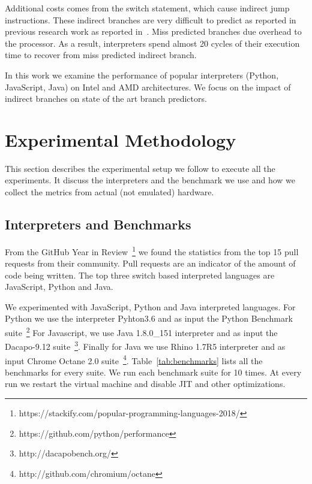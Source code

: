 \documentclass[parskip=full, paper=a4, fontsize=12pt]{scrartcl}
\numberwithin{equation}{section}
\numberwithin{figure}{section}
\numberwithin{table}{section}
\begin{document}
Additional costs comes from the switch statement, which cause indirect
jump instructions. These indirect branches are very difficult to
predict as reported in previous research work as reported
in~\cite{performance_of_interpreters}. Miss predicted branches due
overhead to the processor. As a result, interpreters spend almost 20
cycles of their execution time to recover from miss predicted indirect
branch.

In this work we examine the performance of popular interpreters
(Python, JavaScript, Java) on Intel and AMD architectures. We focus on
the impact of indirect branches on state of the art branch predictors.

\section{Experimental Methodology}
This section describes the experimental setup we follow to execute all
the experiments. It discuss the interpreters and the benchmark we use
and how we collect the metrics from actual (not emulated) hardware.

\subsection{Interpreters and Benchmarks} From the GitHub Year in
Review~\footnote{https://stackify.com/popular-programming-languages-2018/}
we found the statistics from the top 15 pull requests from their
community. Pull requests are an indicator of the amount of code being
written. The top three switch based interpreted languages are
JavaScript, Python and Java.

We experimented with JavaScript, Python and Java interpreted
languages. For Python we use the interpreter Pyhton3.6 and as input
the Python Benchmark
suite~\footnote{https://github.com/python/performance} For Javascript,
we use Java 1.8.0\_151 interpreter and as input the Dacapo-9.12
suite~\footnote{http://dacapobench.org/}.  Finally for Java we use
Rhino 1.7R5 interpreter and as input Chrome Octane 2.0
suite~\footnote{http://github.com/chromium/octane}.
Table~\ref{tab:benchmarks} lists all the benchmarks for every suite.
We run each benchmark suite for 10 times. At every run we restart the
virtual machine and disable JIT and other optimizations.
\end{document}
